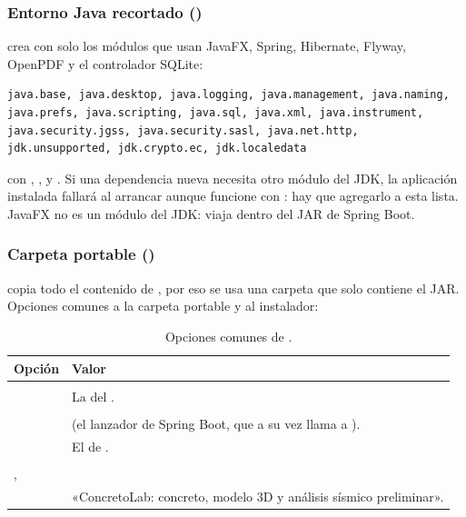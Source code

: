 \subsubsection{Entorno Java recortado ()}

 crea  con solo los módulos que usan JavaFX, Spring, Hibernate, Flyway, OpenPDF y el
controlador SQLite:

\begin{verbatim}
java.base, java.desktop, java.logging, java.management, java.naming,
java.prefs, java.scripting, java.sql, java.xml, java.instrument,
java.security.jgss, java.security.sasl, java.net.http,
jdk.unsupported, jdk.crypto.ec, jdk.localedata
\end{verbatim}

con , ,  y . Si una
dependencia nueva necesita otro módulo del JDK, la aplicación instalada fallará al arrancar aunque funcione con
: hay que agregarlo a esta lista. JavaFX no es un módulo del JDK: viaja dentro del JAR de Spring Boot.

\subsubsection{Carpeta portable ()}

 copia todo el contenido de , por eso se usa una carpeta  que solo
contiene el JAR. Opciones comunes a la carpeta portable y al instalador:

\begin{table}[H]
	\centering
	\caption{Opciones comunes de .}
	\label{tab:dis-jpackage-comunes}
	\begin{tabular}{L{4.6cm}L{10.2cm}}
		\hline
		\textbf{Opción} & \textbf{Valor} \\ \hline
		 &  \\
		 & La del . \\
		 &  \\
		 &  (el lanzador de Spring Boot,
		que a su vez llama a ). \\
		 & El  de . \\
		 &  \\
		,  &  \\
		 & «ConcretoLab: concreto, modelo 3D y análisis sísmico preliminar». \\ \hline
	\end{tabular}
\end{table}

